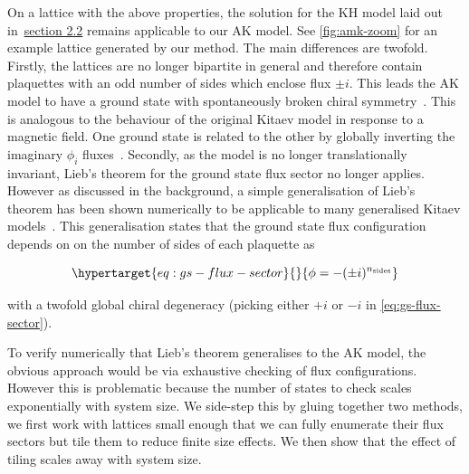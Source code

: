 On a lattice with the above properties, the solution for the KH model laid out in~\protect\hyperlink{bg-hkm-model}{section 2.2} remains applicable to our AK model. See \cref{fig:amk-zoom} for an example lattice generated by our method. The main differences are twofold. Firstly, the lattices are no longer bipartite in general and therefore contain plaquettes with an odd number of sides which enclose flux \(\pm i\). This leads the AK model to have a ground state with spontaneously broken chiral symmetry~\autocite{Chua2011,yaoExactChiralSpin2007,ChuaPRB2011,Fiete2012,Natori2016,Wu2009,Peri2020,WangHaoranPRB2021}. This is analogous to the behaviour of the original Kitaev model in response to a magnetic field. One ground state is related to the other by globally inverting the imaginary \(\phi_i\) fluxes~\autocite{yaoExactChiralSpin2007}. Secondly, as the model is no longer translationally invariant, Lieb's theorem for the ground state flux sector no longer applies. However as discussed in the background, a simple generalisation of Lieb's theorem has been shown numerically to be applicable to many generalised Kitaev models~\autocite{eschmannThermodynamicClassificationThreedimensional2020,Yao2009,eschmann2019thermodynamics,Peri2020}. This generalisation states that the ground state flux configuration depends on on the number of sides of each plaquette as

\begin{equation}\protect\hypertarget{eq:gs-flux-sector}{}{\phi = -(\pm i)^{n_{\mathrm{sides}}}}\label{eq:gs-flux-sector}\end{equation}

with a twofold global chiral degeneracy (picking either \(+i\) or \(-i\) in \cref{eq:gs-flux-sector}).

To verify numerically that Lieb's theorem generalises to the AK model, the obvious approach would be via exhaustive checking of flux configurations. However this is problematic because the number of states to check scales exponentially with system size. We side-step this by gluing together two methods, we first work with lattices small enough that we can fully enumerate their flux sectors but tile them to reduce finite size effects. We then show that the effect of tiling scales away with system size.

